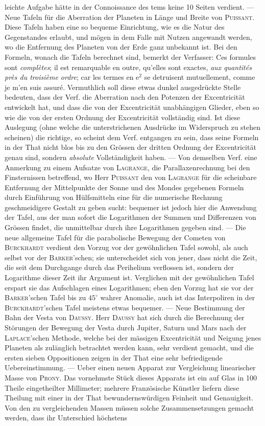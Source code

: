 \noindent leichte Aufgabe hätte in der Connoissance des tems keine 10 Seiten verdient. --- Neue Tafeln für die Aberration der Planeten in Länge und Breite von \textsc{Puissant}. Diese Tafeln haben eine so bequeme Einrichtung, wie es die Natur des Gegenstandes erlaubt, und mögen in dem Falle mit Nutzen angewandt werden, wo die Entfernung des Planeten von der Erde ganz unbekannt ist. Bei den Formeln, wonach die Tafeln berechnet sind, bemerkt der Verfasser: Ces formules sont \emph{complètes}; il est remarquable en outre, qu'elles sont exactes, \emph{aux quantités près du troisième ordre}; car les termes en $\mathrm{e}^2$ se detruisent mutuellement, comme je m'en suis assuré. Vermuthlich soll diese etwas dunkel ausgedrückte Stelle bedeuten, dass der Verf. die Aberration nach den Potenzen der Excentricität entwickelt hat, und dass die von der Excentricität unabhängigen Glieder, eben so wie die von der ersten Ordnung der Excentricität vollständig sind. Ist diese Auslegung (ohne welche die unterstrichenen Ausdrücke im Widerspruch zu stehen scheinen) die richtige, so scheint dem Verf. entgangen zu sein, dass seine Formeln in der That nicht blos bis zu den Grössen der dritten Ordnung der Excentricität genau sind, sondern \emph{absolute} Vollständigkeit haben. --- Von demselben Verf. eine Anmerkung zu einem Aufsatze von \textsc{Lagrange}, die Parallaxenrechnung bei den Finsternissen betreffend, wo Herr \textsc{Puissant} den von \textsc{Lagrange} für die scheinbare Entfernung der Mittelpunkte der Sonne und des Mondes gegebenen Formeln durch Einführung von Hülfsmitteln eine für die numerische Rechnung geschmeidigere Gestalt zu geben sucht: bequemer ist jedoch hier die Anwendung der Tafel, aus der man sofort die Logarithmen der Summen und Differenzen von Grössen findet, die unmittelbar durch ihre Logarithmen gegeben sind. --- Die neue allgemeine Tafel für die parabolische Bewegung der Cometen von \textsc{Burckhardt} verdient den Vorzug vor der gewöhnlichen Tafel sowohl, als auch selbst vor der \textsc{Barker}'schen; sie unterscheidet sich von jener, dass nicht die Zeit, die seit dem Durchgange durch das Perihelium verflossen ist, sondern der Logarithme dieser Zeit ihr Argument ist. Verglichen mit der gewöhnlichen Tafel erspart sie das Aufschlagen eines Logarithmen; eben den Vorzug hat sie vor der \textsc{Barker}'schen Tafel bis zu $45^\circ$ wahrer Anomalie, auch ist das Interpoliren in der \textsc{Burckhardt}'schen Tafel meistens etwas bequemer. --- Neue Bestimmung der Bahn der Vesta von \textsc{Daussy}. Herr \textsc{Daussy} hat sich durch die Berechnung der Störungen der Bewegung der Vesta durch Jupiter, Saturn und Mars nach der \textsc{Laplace}'schen Methode, welche bei der mässigen Excentricität und Neigung jenes Planeten als zulänglich betrachtet werden kann, sehr verdient gemacht, und die ersten sieben Oppositionen zeigen in der That eine sehr befriedigende Uebereinstimmung. --- Ueber einen neuen Apparat zur Vergleichung linearischer Masse von \textsc{Prony}. Das vornehmste Stück dieses Apparats ist ein auf Glas in 100 Theile eingetheilter Millimeter; mehrere Französische Künstler liefern diese Theilung mit einer in der That bewundernswürdigen Feinheit und Genauigkeit. Von den zu vergleichenden Massen müssen solche Zusammensetzungen gemacht werden, dass ihr Unterschied höchstens 